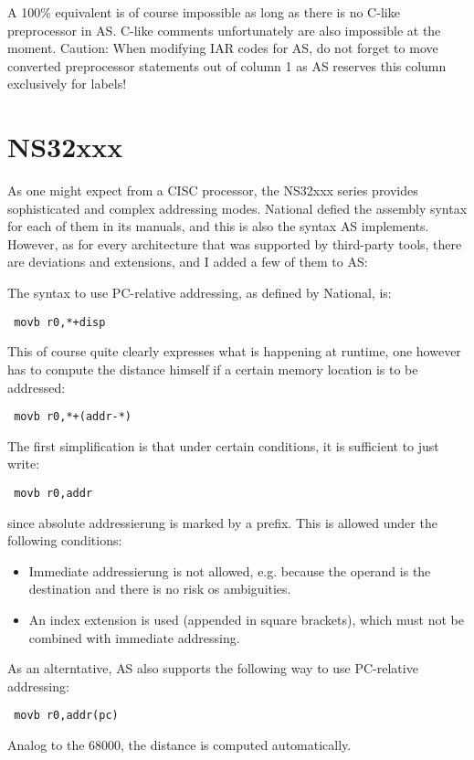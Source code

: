 \documentclass[12pt,twoside]{report}
\newcommand{\asname}{{AS}}
\begin{document}
A 100\% equivalent is of course impossible as long as there is no C-like
preprocessor in \asname{}.  C-like comments unfortunately are also impossible
at the moment.  Caution: When modifying IAR codes for \asname{}, do not forget to
move converted preprocessor statements out of column 1 as \asname{} reserves this
column exclusively for labels!


\section{NS32xxx}

As one might expect from a CISC processor, the NS32xxx series provides
sophisticated and complex addressing modes.  National defied the assembly syntax
for each of them in its manuals, and this is also the syntax \asname{} implements.
However, as for every architecture that was supported by third-party tools,
there are deviations and extensions, and I added a few of them to \asname{}:

The syntax to use PC-relative addressing, as defined by National, is:
\begin{verbatim}
 movb r0,*+disp
\end{verbatim}
This of course quite clearly expresses what is happening at runtime, one however
has to compute the distance himself if a certain memory location is to be
addressed:
\begin{verbatim}
 movb r0,*+(addr-*)
\end{verbatim}
The first simplification is that under certain conditions, it is sufficient to
just write:
\begin{verbatim}
 movb r0,addr
\end{verbatim}
since absolute addressierung is marked by a \@ prefix.  This is allowed under
the following conditions:
\begin{itemize}
\item{Immediate addressierung is not allowed, e.g. because the operand is
      the destination and there is no risk os ambiguities.}
\item{An index extension is used (appended in square brackets), which must not
      be combined with immediate addressing.}
\end{itemize}
As an alterntative, \asname{} also supports the following way to use PC-relative addressing:
\begin{verbatim}
 movb r0,addr(pc)
\end{verbatim}
Analog to the 68000, the distance is computed automatically.
\end{document}

